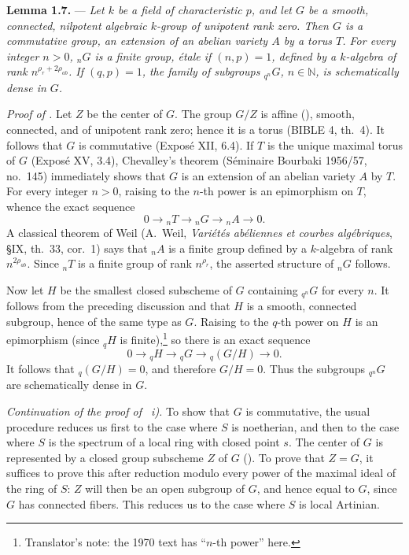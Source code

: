 \medskip
\noindent{}%
\textbf{Lemma 1.7.} --- \textit{Let \(k\) be a field of
characteristic \(p\), and let \(G\) be a smooth, connected, nilpotent
algebraic \(k\)-group of unipotent rank zero. Then \(G\) is a
commutative group, an extension of an abelian variety \(A\) by a
torus \(T\). For every integer \(n>0\), \({}_{n}G\) is a finite
group, étale if \((n,p)=1\), defined by a \(k\)-algebra of rank
\(n^{\rho_r+2\rho_{ab}}\). If \((q,p)=1\), the family of subgroups
\({}_{q^n}G\), \(n\in\mathbb N\), is schematically dense in \(G\).}

\smallskip
\noindent\textit{Proof of .}
Let \(Z\) be the center of \(G\). The group \(G/Z\) is affine
(), smooth, connected, and of unipotent rank zero;
hence it is a torus (BIBLE 4, th.~4). It follows that \(G\) is
commutative (Exposé XII, 6.4). If \(T\) is the unique maximal torus
of \(G\) (Exposé XV, 3.4), Chevalley's theorem (Séminaire Bourbaki
1956/57, no.~145) immediately shows that \(G\) is an extension of an
abelian variety \(A\) by \(T\). For every integer \(n>0\), raising to
the \(n\)-th power is an epimorphism on \(T\), whence the exact
sequence
\[
  0\longrightarrow {}_{n}T\longrightarrow {}_{n}G
  \longrightarrow {}_{n}A\longrightarrow 0.
\]
A classical theorem of Weil (A.~Weil, \emph{Variétés abéliennes et
courbes algébriques}, \S IX, th.~33, cor.~1) says that \({}_{n}A\)
is a finite group defined by a \(k\)-algebra of rank
\(n^{2\rho_{ab}}\). Since \({}_{n}T\) is a finite group of rank
\(n^{\rho_r}\), the asserted structure of \({}_{n}G\) follows.

Now let \(H\) be the smallest closed subscheme of \(G\) containing
\({}_{q^n}G\) for every \(n\). It follows from the preceding
discussion and  that \(H\) is a smooth, connected
subgroup, hence of the same type as \(G\). Raising to the \(q\)-th
power on \(H\) is an epimorphism (since \({}_{q}H\) is finite),\footnote{Translator's note: the 1970
text has ``\(n\)-th power'' here.} so
there is an exact sequence
\[
  0\longrightarrow {}_{q}H\longrightarrow {}_{q}G
  \longrightarrow {}_{q}(G/H)\longrightarrow 0.
\]
It follows that \({}_{q}(G/H)=0\), and therefore \(G/H=0\). Thus the
subgroups \({}_{q^n}G\) are schematically dense in \(G\).

\smallskip
\noindent\textit{Continuation of the proof of ~i).}
To show that \(G\) is commutative, the usual procedure reduces us
first to the case where \(S\) is noetherian, and then to the case
where \(S\) is the spectrum of a local ring with closed point \(s\).
The center of \(G\) is represented by a closed group subscheme \(Z\)
of \(G\) (). To prove that \(Z=G\), it suffices to
prove this after reduction modulo every power of the maximal ideal of
the ring of \(S\): \(Z\) will then be an open subgroup of \(G\), and
hence equal to \(G\), since \(G\) has connected fibers. This reduces
us to the case where \(S\) is local Artinian.

